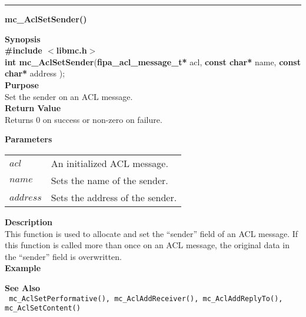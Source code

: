 \noindent
\vspace{5pt}
\rule{6.5in}{0.015in}
\noindent
{}
{\LARGE \bf mc\_AclSetSender()}\\
\label{api:mc_AclSetSender()}

\noindent
{\bf Synopsis}\\
{\bf \#include $<$libmc.h$>$}\\
{\bf int mc\_AclSetSender}({\bf fipa\_acl\_message\_t*} acl, {\bf const char*} name, {\bf const char*} address );\\

\noindent
{\bf Purpose}\\
Set the sender on an ACL message.\\

\noindent
{\bf Return Value}\\
Returns 0 on success or non-zero on failure.

\noindent
{\bf Parameters}
\vspace{-0.1in}
\begin{description}
\item
\begin{tabular}{p{10 mm}p{145 mm}} 
$acl$ & An initialized ACL message. \\
$name$ & Sets the name of the sender. \\
$address$ & Sets the address of the sender. 
\end{tabular}
\end{description}

\noindent
{\bf Description}\\
This function is used to allocate and set the ``sender'' field of
an ACL message. If this function is called more than once on an ACL 
message, the original data in the ``sender'' field is overwritten.\\

\noindent
{\bf Example}\\
\noindent
{\footnotesize}

\noindent
{\bf See Also}\\
\texttt{
  mc\_AclSetPerformative(), mc\_AclAddReceiver(), mc\_AclAddReplyTo(), 
    \linebreak mc\_AclSetContent()
}

